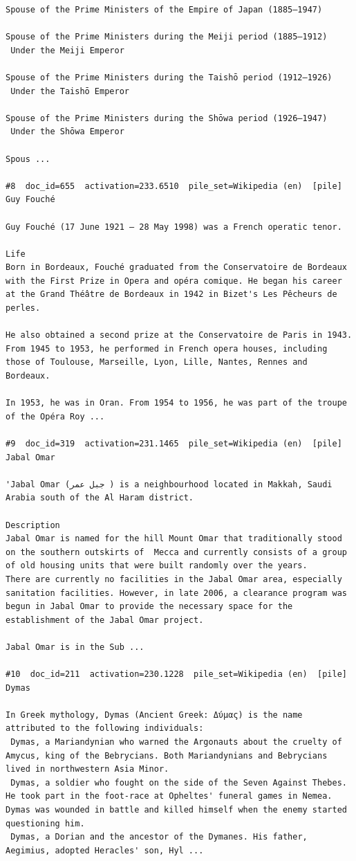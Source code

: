 \begin{verbatim}
Spouse of the Prime Ministers of the Empire of Japan (1885–1947)

Spouse of the Prime Ministers during the Meiji period (1885–1912)
 Under the Meiji Emperor

Spouse of the Prime Ministers during the Taishō period (1912–1926)
 Under the Taishō Emperor

Spouse of the Prime Ministers during the Shōwa period (1926–1947)
 Under the Shōwa Emperor

Spous ...

#8  doc_id=655  activation=233.6510  pile_set=Wikipedia (en)  [pile]
Guy Fouché

Guy Fouché (17 June 1921 – 28 May 1998) was a French operatic tenor.

Life 
Born in Bordeaux, Fouché graduated from the Conservatoire de Bordeaux with the First Prize in Opera and opéra comique. He began his career at the Grand Théâtre de Bordeaux in 1942 in Bizet's Les Pêcheurs de perles.

He also obtained a second prize at the Conservatoire de Paris in 1943. From 1945 to 1953, he performed in French opera houses, including those of Toulouse, Marseille, Lyon, Lille, Nantes, Rennes and Bordeaux.

In 1953, he was in Oran. From 1954 to 1956, he was part of the troupe of the Opéra Roy ...

#9  doc_id=319  activation=231.1465  pile_set=Wikipedia (en)  [pile]
Jabal Omar

'Jabal Omar (جبل عمر ) is a neighbourhood located in Makkah, Saudi Arabia south of the Al Haram district.

Description 
Jabal Omar is named for the hill Mount Omar that traditionally stood on the southern outskirts of  Mecca and currently consists of a group of old housing units that were built randomly over the years. 
There are currently no facilities in the Jabal Omar area, especially sanitation facilities. However, in late 2006, a clearance program was begun in Jabal Omar to provide the necessary space for the establishment of the Jabal Omar project. 

Jabal Omar is in the Sub ...

#10  doc_id=211  activation=230.1228  pile_set=Wikipedia (en)  [pile]
Dymas

In Greek mythology, Dymas (Ancient Greek: Δύμας) is the name attributed to the following individuals:
 Dymas, a Mariandynian who warned the Argonauts about the cruelty of Amycus, king of the Bebrycians. Both Mariandynians and Bebrycians lived in northwestern Asia Minor.
 Dymas, a soldier who fought on the side of the Seven Against Thebes. He took part in the foot-race at Opheltes' funeral games in Nemea. Dymas was wounded in battle and killed himself when the enemy started questioning him.
 Dymas, a Dorian and the ancestor of the Dymanes. His father, Aegimius, adopted Heracles' son, Hyl ...


\end{verbatim}
